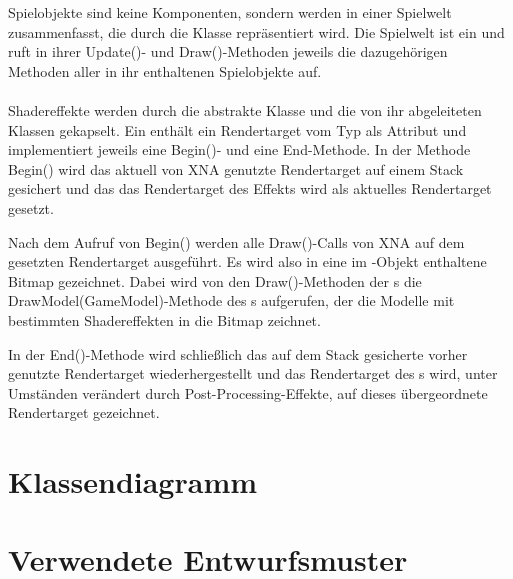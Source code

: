 Spielobjekte sind keine Komponenten, sondern werden in einer Spielwelt zusammenfasst, die durch die Klasse  repräsentiert wird. Die Spielwelt ist ein  und ruft in ihrer Update()- und Draw()-Methoden jeweils die dazugehörigen Methoden aller in ihr enthaltenen Spielobjekte auf.
\\\\
Shadereffekte werden durch die abstrakte Klasse  und die von ihr abgeleiteten Klassen gekapselt. Ein  enthält ein Rendertarget vom Typ  als Attribut und implementiert jeweils eine Begin()- und eine End-Methode. In der Methode Begin() wird das aktuell von XNA genutzte Rendertarget auf einem Stack gesichert und das das Rendertarget des Effekts wird als aktuelles Rendertarget gesetzt.

Nach dem Aufruf von Begin() werden alle Draw()-Calls von XNA auf dem gesetzten Rendertarget ausgeführt. Es wird also in eine im -Objekt enthaltene Bitmap gezeichnet. Dabei wird von den Draw()-Methoden der s die DrawModel(GameModel)-Methode des s aufgerufen, der die Modelle mit bestimmten Shadereffekten in die Bitmap zeichnet.

In der End()-Methode wird schließlich das auf dem Stack gesicherte vorher genutzte Rendertarget wiederhergestellt und das Rendertarget des s wird, unter Umständen verändert durch Post-Processing-Effekte, auf dieses übergeordnete Rendertarget gezeichnet.



\section{Klassendiagramm}

\section{Verwendete Entwurfsmuster}

